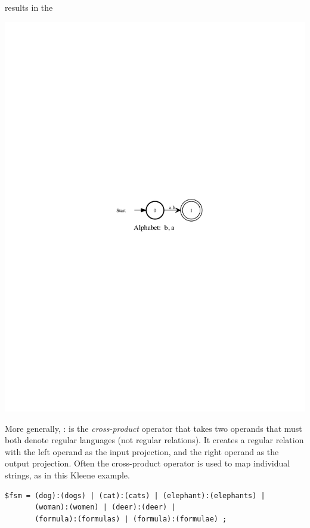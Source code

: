 \noindent
results in the \fst{}


\begin{center}
\includegraphics{images/aoverb.pdf}
\end{center}


\noindent
More generally, : is the \emph{cross-product} operator that takes two operands that must
both denote regular languages (not regular relations).  It creates a regular relation with the
left operand as the input projection, and the right operand as the output projection.
Often the cross-product operator is used to map
individual strings, as in this Kleene example.


\begin{Verbatim}
$fsm = (dog):(dogs) | (cat):(cats) | (elephant):(elephants) |
       (woman):(women) | (deer):(deer) |
       (formula):(formulas) | (formula):(formulae) ;
\end{Verbatim}


